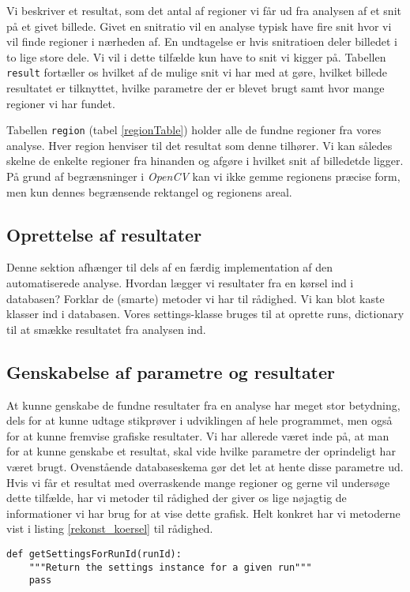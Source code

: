{Vi beskriver et resultat, som det antal af regioner vi får ud fra
analysen af et snit på et givet billede. Givet en snitratio vil en
analyse typisk have fire snit hvor vi vil finde regioner i nærheden af.
En undtagelse er hvis snitratioen deler billedet i to lige store dele.
Vi vil i dette tilfælde kun have to snit vi kigger på. Tabellen
\texttt{result} fortæller os hvilket af de mulige snit vi har med at
gøre, hvilket billede resultatet er tilknyttet, hvilke parametre der er
blevet brugt samt hvor mange regioner vi har fundet.

Tabellen \texttt{region} (tabel \ref{regionTable}) holder alle de fundne
regioner fra vores analyse. Hver region henviser til det resultat som
denne tilhører. Vi kan således skelne de enkelte regioner fra hinanden
og afgøre i hvilket snit af billedetde ligger.  På grund af
begrænsninger i \emph{OpenCV} kan vi ikke gemme regionens præcise form, men kun
dennes begrænsende rektangel og regionens areal.

\subsection{Oprettelse af resultater}
Denne sektion afhænger til dels af en færdig implementation af den
automatiserede analyse. Hvordan lægger vi resultater fra en kørsel ind i
databasen? Forklar de (smarte) metoder vi har til rådighed. Vi kan blot
kaste klasser ind i databasen. Vores settings-klasse bruges til at
oprette runs, dictionary til at smække resultatet fra analysen ind.

\subsection{Genskabelse af parametre og resultater}
At kunne genskabe de fundne resultater fra en analyse har meget stor
betydning, dels for at kunne udtage stikprøver i udviklingen af hele
programmet, men også for at kunne fremvise grafiske resultater. Vi har
allerede været inde på, at man for at kunne genskabe et resultat, skal
vide hvilke parametre der oprindeligt har været brugt. Ovenstående
databaseskema gør det let at hente disse parametre ud. Hvis vi får et
resultat med overraskende mange regioner og gerne vil undersøge dette
tilfælde, har vi metoder til rådighed der giver os lige nøjagtig de
informationer vi har brug for at vise dette grafisk. Helt konkret har vi
metoderne vist i listing \ref{rekonst_koersel} til rådighed.

\vspace{0.5cm}
\begin{lstlisting}[caption={Metoder til rekonstruktion af kørsler},captionpos=b,label={rekonst_koersel},numbers=none]
def getSettingsForRunId(runId):
    """Return the settings instance for a given run"""
    pass


\end{lstlisting}}

